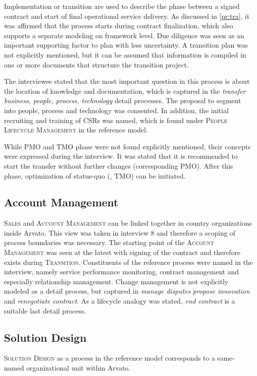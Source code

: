 	Implementation or transition are used to describe the phase between a signed contract and start of final operational service delivery. As discussed in \ref{pr:tra}, it was affirmed that the process starts during contract finalization, which also supports a separate modeling on framework level. Due diligence was seen as an important supporting factor to plan with less uncertainty. A transition plan was not explicitly mentioned, but it can be assumed that information is compiled in one or more documents that structure the transition project. 
	
	The interviewee stated that the most important question in this process is about the location of knowledge and documentation, which is captured in the \textit{transfer business, people, process, technology} detail processes. The proposal to segment into people, process and technology was consented. In addition, the initial recruiting and training of \acrshort{CSR}s was named, which is found under \textsc{People Lifecycle Management} in the reference model. 
	
	While \acrshort{PMO} and \acrshort{TMO} phase were not found explicitly mentioned, their concepts were expressed during the interview. It was stated that it is recommended to start the transfer without further changes (corresponding \acrshort{PMO}). After this phase, optimization of status-quo (\ie, \acrshort{TMO}) can be initiated. 
	
	\subsection{Account Management}
	 \textsc{Sales} and \textsc{Account Management} can be linked together in country organizations inside Arvato. This view was taken in interview 8 and therefore a scoping of process boundaries was necessary. The starting point of the \textsc{Account Management} was seen at the latest with signing of the contract and therefore exists during \textsc{Transition}. Constituents of the reference process were named in the interview, namely service performance monitoring, contract management and especially relationship management. Change management is not explicitly modeled as a detail process, but captured in \textit{manage disputes} \textit{propose innovation} and \textit{renegotiate contract}. As a lifecycle analogy was stated, \textit{end contract} is a suitable last detail process. 
          
   	\subsection{Solution Design}
	\textsc{Solution Design} as a process in the reference model corresponds to a same-named organizational unit within Arvato. 


